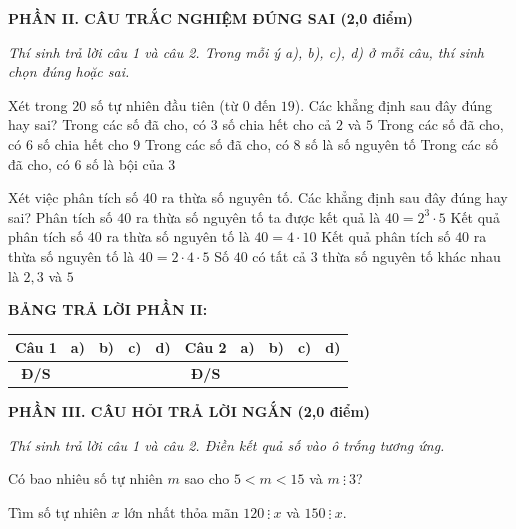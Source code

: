 \documentclass[12pt,a4paper]{article}
\begin{document}
\setcounter{ex}{0}
\noindent\textbf{\large PHẦN II. CÂU TRẮC NGHIỆM ĐÚNG SAI (2,0 điểm)}

\textit{Thí sinh trả lời câu 1 và câu 2. Trong mỗi ý a), b), c), d) ở mỗi câu, thí sinh chọn đúng hoặc sai.}

\vspace{1mm}
\begin{ex}
Xét trong $20$ số tự nhiên đầu tiên (từ $0$ đến $19$). Các khẳng định sau đây đúng hay sai?
\choiceTF
{Trong các số đã cho, có $3$ số chia hết cho cả $2$ và $5$}
{Trong các số đã cho, có $6$ số chia hết cho $9$}
{\True Trong các số đã cho, có $8$ số là số nguyên tố}
{Trong các số đã cho, có $6$ số là bội của $3$}
\end{ex}

\begin{ex}
Xét việc phân tích số $40$ ra thừa số nguyên tố. Các khẳng định sau đây đúng hay sai?
\choiceTF
{\True Phân tích số $40$ ra thừa số nguyên tố ta được kết quả là $40 = 2^3 \cdot 5$}
{Kết quả phân tích số $40$ ra thừa số nguyên tố là $40 = 4 \cdot 10$}
{Kết quả phân tích số $40$ ra thừa số nguyên tố là $40 = 2 \cdot 4 \cdot 5$}
{Số $40$ có tất cả $3$ thừa số nguyên tố khác nhau là $2, 3$ và $5$}
\end{ex}


\noindent\textbf{BẢNG TRẢ LỜI PHẦN II:}
\begin{center}
\begin{tabular}{|c|c|c|c|c||c|c|c|c|c|}
\hline
\textbf{Câu 1} & \textbf{a)} & \textbf{b)} & \textbf{c)} & \textbf{d)} & \textbf{Câu 2} & \textbf{a)} & \textbf{b)} & \textbf{c)} & \textbf{d)} \\
\hline
\textbf{Đ/S} & \rule{0pt}{0.6cm} & & & & \textbf{Đ/S} & & & & \\
\hline
\end{tabular}
\end{center}
\vspace{2mm}

\setcounter{ex}{0}
\noindent\textbf{\large PHẦN III. CÂU HỎI TRẢ LỜI NGẮN (2,0 điểm)}

\textit{Thí sinh trả lời câu 1 và câu 2. Điền kết quả số vào ô trống tương ứng.}

\vspace{1mm}
\begin{ex}
Có bao nhiêu số tự nhiên $m$ sao cho $5 < m < 15$ và $m \ \vdots \ 3$? 
\end{ex}

\begin{ex}
Tìm số tự nhiên $x$ lớn nhất thỏa mãn $120 \ \vdots \ x$ và $150 \ \vdots \ x$. 
\end{ex}
\end{document}
